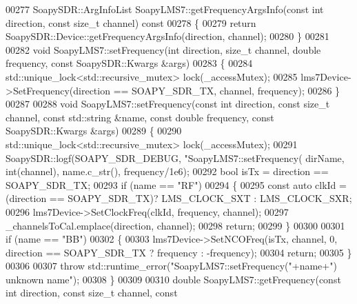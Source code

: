 \begin{DoxyCode}
{{{{{{{{{{00277 SoapySDR::ArgInfoList SoapyLMS7::getFrequencyArgsInfo(\textcolor{keyword}{const} \textcolor{keywordtype}{int} direction, \textcolor{keyword}{const} \textcolor{keywordtype}{size\_t} channel)\textcolor{keyword}{ const}
00278 \textcolor{keyword}{}\{
00279     \textcolor{keywordflow}{return} SoapySDR::Device::getFrequencyArgsInfo(direction, channel);
00280 \}
00281 
00282 \textcolor{keywordtype}{void} SoapyLMS7::setFrequency(\textcolor{keywordtype}{int} direction, \textcolor{keywordtype}{size\_t} channel, \textcolor{keywordtype}{double} frequency, \textcolor{keyword}{const} 
      SoapySDR::Kwargs &args)
00283 \{
00284     std::unique\_lock<std::recursive\_mutex> lock(_accessMutex);
00285     lms7Device->SetFrequency(direction == SOAPY_SDR_TX, channel, frequency);
00286 \}
00287 
00288 \textcolor{keywordtype}{void} SoapyLMS7::setFrequency(\textcolor{keyword}{const} \textcolor{keywordtype}{int} direction, \textcolor{keyword}{const} \textcolor{keywordtype}{size\_t} channel, \textcolor{keyword}{const} 
      std::string &name, \textcolor{keyword}{const} \textcolor{keywordtype}{double} frequency, \textcolor{keyword}{const} SoapySDR::Kwargs &args)
00289 \{
00290     std::unique\_lock<std::recursive\_mutex> lock(_accessMutex);
00291     SoapySDR::logf(SOAPY_SDR_DEBUG, \textcolor{stringliteral}{"SoapyLMS7::setFrequency(%
      dirName, \textcolor{keywordtype}{int}(channel), name.c\_str(), frequency/1e6);
00292     \textcolor{keywordtype}{bool} isTx = direction == SOAPY_SDR_TX;
00293     \textcolor{keywordflow}{if} (name == \textcolor{stringliteral}{"RF"})
00294     \{
00295         \textcolor{keyword}{const} \textcolor{keyword}{auto} clkId = (direction == SOAPY_SDR_TX)? LMS_CLOCK_SXT : 
      LMS_CLOCK_SXR;
00296         lms7Device->SetClockFreq(clkId, frequency, channel);
00297         _channelsToCal.emplace(direction, channel);
00298         \textcolor{keywordflow}{return};
00299     \}
00300 
00301     \textcolor{keywordflow}{if} (name == \textcolor{stringliteral}{"BB"})
00302     \{
00303         lms7Device->SetNCOFreq(isTx, channel, 0, direction == SOAPY_SDR_TX ? 
      frequency : -frequency);
00304         \textcolor{keywordflow}{return};
00305     \}
00306 
00307     \textcolor{keywordflow}{throw} std::runtime\_error(\textcolor{stringliteral}{"SoapyLMS7::setFrequency("}+name+\textcolor{stringliteral}{") unknown name"});
00308 \}
00309 
00310 \textcolor{keywordtype}{double} SoapyLMS7::getFrequency(\textcolor{keyword}{const} \textcolor{keywordtype}{int} direction, \textcolor{keyword}{const} \textcolor{keywordtype}{size\_t} channel, \textcolor{keyword}{const} 
}}}}}}}}}}}
\end{DoxyCode}
